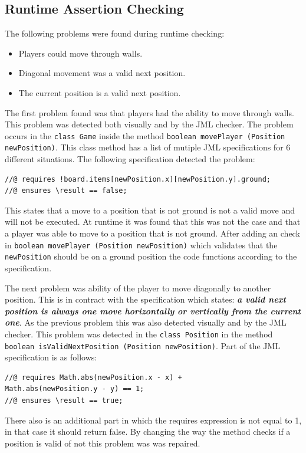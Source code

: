 \documentclass[a4paper]{article}
\begin{document}
	\subsection{Runtime Assertion Checking}
	The following problems were found during runtime checking:
	\begin{itemize}
		\item Players could move through walls.
		\item Diagonal movement was a valid next position.
		\item The current position is a valid next position.
	\end{itemize}
	The first problem found was that players had the ability to move through walls. This problem was detected both visually and by the JML checker. The problem occurs in the \texttt{class Game} inside the method \texttt{boolean movePlayer (Position newPosition)}. This class method has a list of mutiple JML specifications for 6 different situations. The following specification detected the problem:
	\begin{lstlisting}
//@ requires !board.items[newPosition.x][newPosition.y].ground;
//@ ensures \result == false;
	\end{lstlisting}
	This states that a move to a position that is not ground is not a valid move and will not be executed. At runtime it was found that this was not the case and that a player was able to move to a position that is not ground. After adding an check in \texttt{boolean movePlayer (Position newPosition)} which validates that the \texttt{newPosition} should be on a ground position the code functions according to the specification.
	
	The next problem was ability of the player to move diagonally to another position. This is in contract with the specification which states: \textbf{\textit{a valid next position is always one move horizontally or vertically from the current one}}. As the previous problem this was also detected visually and by the JML checker. This problem was detected in the \texttt{class Position} in the method \texttt{boolean isValidNextPosition (Position newPosition)}. Part of the JML specification is as follows:
	\begin{lstlisting}
//@ requires Math.abs(newPosition.x - x) + 
Math.abs(newPosition.y - y) == 1;
//@ ensures \result == true;
	\end{lstlisting}
	There also is an additional part in which the requires expression is not equal to 1, in that case it should return false. By changing the way the method checks if a position is valid of not this problem was was repaired.
	
\end{document}

